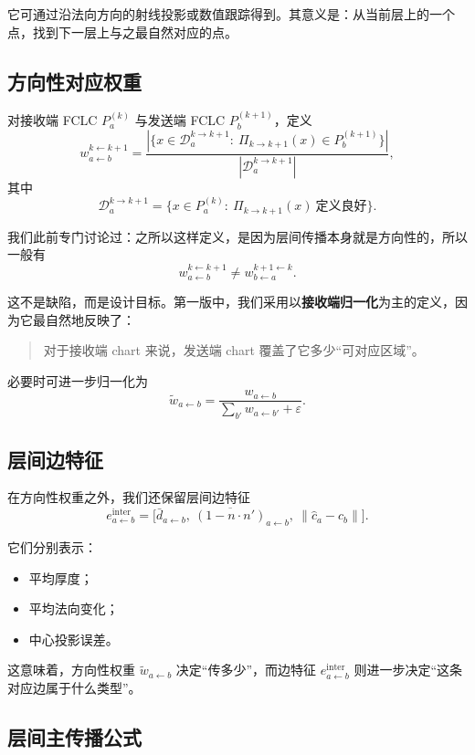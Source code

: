 \documentclass[12pt,a4paper]{ctexart}
\begin{document}
它可通过沿法向方向的射线投影或数值跟踪得到。其意义是：从当前层上的一个点，找到下一层上与之最自然对应的点。

\subsection{方向性对应权重}

对接收端 FCLC \(P_a^{(k)}\) 与发送端 FCLC \(P_b^{(k+1)}\)，定义
\[
w_{a\leftarrow b}^{k\leftarrow k+1}
=
\frac{
\left|
\{x\in\mathcal D_a^{k\to k+1}:\ \Pi_{k\to k+1}(x)\in P_b^{(k+1)}\}
\right|
}{
|\mathcal D_a^{k\to k+1}|
},
\]
其中
\[
\mathcal D_a^{k\to k+1}
=
\{x\in P_a^{(k)}:\ \Pi_{k\to k+1}(x)\ \text{定义良好}\}.
\]

我们此前专门讨论过：之所以这样定义，是因为层间传播本身就是方向性的，所以一般有
\[
w_{a\leftarrow b}^{k\leftarrow k+1}
\neq
w_{b\leftarrow a}^{k+1\leftarrow k}.
\]

这不是缺陷，而是设计目标。第一版中，我们采用以\textbf{接收端归一化}为主的定义，因为它最自然地反映了：

\begin{quote}
对于接收端 chart 来说，发送端 chart 覆盖了它多少“可对应区域”。
\end{quote}

必要时可进一步归一化为
\[
\tilde w_{a\leftarrow b}
=
\frac{
w_{a\leftarrow b}
}{
\sum_{b'}w_{a\leftarrow b'}+\varepsilon
}.
\]

\subsection{层间边特征}

在方向性权重之外，我们还保留层间边特征
\[
e_{a\leftarrow b}^{\mathrm{inter}}
=
\big[
\bar d_{a\leftarrow b},\
\overline{(1-n\cdot n')}_{a\leftarrow b},\
\|\hat c_a-c_b\|
\big].
\]

它们分别表示：
\begin{itemize}[leftmargin=2em]
    \item 平均厚度；
    \item 平均法向变化；
    \item 中心投影误差。
\end{itemize}

这意味着，方向性权重 \(\tilde w_{a\leftarrow b}\) 决定“传多少”，而边特征 \(e_{a\leftarrow b}^{\mathrm{inter}}\) 则进一步决定“这条对应边属于什么类型”。

\subsection{层间主传播公式}
\end{document}
